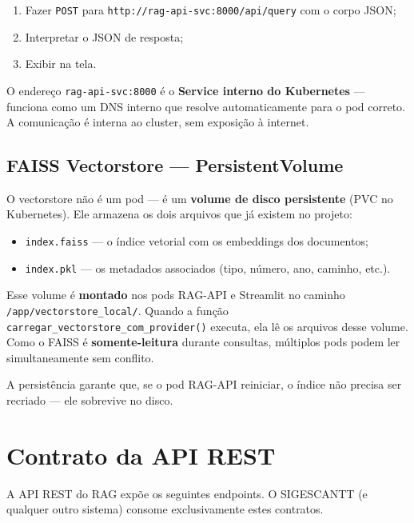 \documentclass[12pt, a4paper]{article}
\begin{document}
\begin{enumerate}[label=\textbf{\arabic*.}]
  \item Fazer \texttt{POST} para \texttt{http://rag-api-svc:8000/api/query} com o corpo JSON;
  \item Interpretar o JSON de resposta;
  \item Exibir na tela.
\end{enumerate}

O endereço \texttt{rag-api-svc:8000} é o \textbf{Service interno do Kubernetes} --- funciona como um DNS interno que resolve automaticamente para o pod correto. A comunicação é interna ao cluster, sem exposição à internet.

\subsection{FAISS Vectorstore --- PersistentVolume}

O vectorstore não é um pod --- é um \textbf{volume de disco persistente} (PVC no Kubernetes). Ele armazena os dois arquivos que já existem no projeto:

\begin{itemize}
  \item \texttt{index.faiss} --- o índice vetorial com os embeddings dos documentos;
  \item \texttt{index.pkl} --- os metadados associados (tipo, número, ano, caminho, etc.).
\end{itemize}

Esse volume é \textbf{montado} nos pods RAG-API e Streamlit no caminho \\ \texttt{/app/vectorstore\_local/}. Quando a função \texttt{carregar\_vectorstore\_com\_provider()} executa, ela lê os arquivos desse volume. Como o FAISS é \textbf{somente-leitura} durante consultas, múltiplos pods podem ler simultaneamente sem conflito.

A persistência garante que, se o pod RAG-API reiniciar, o índice não precisa ser recriado --- ele sobrevive no disco.

\section{Contrato da API REST}

A API REST do RAG expõe os seguintes endpoints. O SIGESCANTT (e qualquer outro sistema) consome exclusivamente estes contratos.
\end{document}
